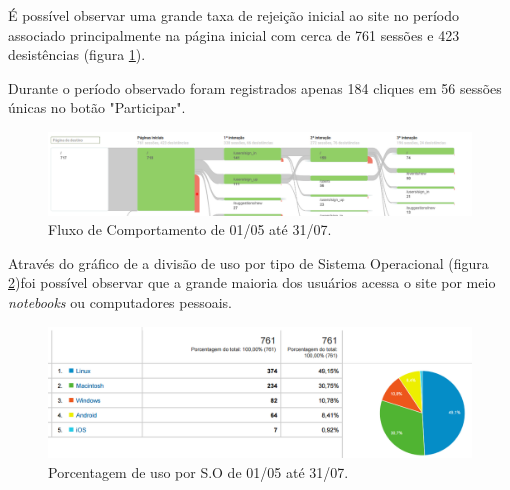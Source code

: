 \par É possível observar uma grande taxa de rejeição inicial ao site no período associado principalmente na página inicial com cerca de 761 sessões e 423 desistências (figura \ref{fig:analytics_1ainteracao_fluxo}).
\par Durante o período observado foram registrados apenas 184 cliques em 56 sessões únicas no botão "Participar".
\begin{figure}[htb]
\includegraphics[width=15cm]{figuras/analytics_1ainteracao_fluxo}
\caption{\label{fig:analytics_1ainteracao_fluxo} Fluxo de Comportamento de 01/05 até 31/07.}
\end{figure}
\par Através do gráfico de a divisão de uso por tipo de Sistema Operacional (figura \ref{fig:analytics_1interacao_so})foi possível observar que a grande maioria dos usuários acessa o site por meio \emph{notebooks} ou computadores pessoais.
\begin{figure}[htb]
\includegraphics[width=15cm]{figuras/analytics_1interacao_so}
\caption{\label{fig:analytics_1interacao_so} Porcentagem de uso por S.O de 01/05 até 31/07.}
\end{figure}
